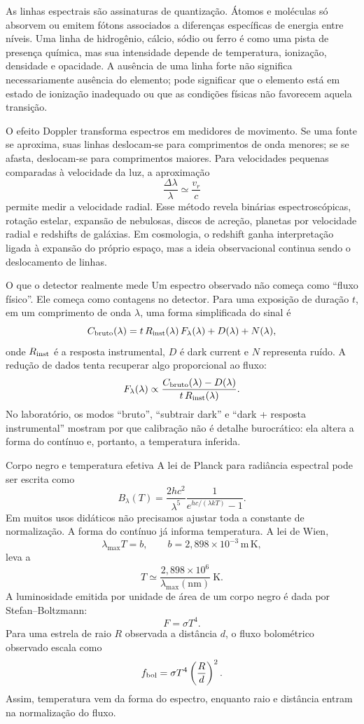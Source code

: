 \documentclass[11pt,a4paper]{article}
\begin{document}
As linhas espectrais são assinaturas de quantização. Átomos e moléculas só absorvem ou emitem fótons associados a diferenças específicas de energia entre níveis. Uma linha de hidrogênio, cálcio, sódio ou ferro é como uma pista de presença química, mas sua intensidade depende de temperatura, ionização, densidade e opacidade. A ausência de uma linha forte não significa necessariamente ausência do elemento; pode significar que o elemento está em estado de ionização inadequado ou que as condições físicas não favorecem aquela transição.

O efeito Doppler transforma espectros em medidores de movimento. Se uma fonte se aproxima, suas linhas deslocam-se para comprimentos de onda menores; se se afasta, deslocam-se para comprimentos maiores. Para velocidades pequenas comparadas à velocidade da luz, a aproximação
\[
\frac{\Delta\lambda}{\lambda}\simeq\frac{v_r}{c}
\]
permite medir a velocidade radial. Esse método revela binárias espectroscópicas, rotação estelar, expansão de nebulosas, discos de acreção, planetas por velocidade radial e redshifts de galáxias. Em cosmologia, o redshift ganha interpretação ligada à expansão do próprio espaço, mas a ideia observacional continua sendo o deslocamento de linhas.

\begin{lessonblock}{O que o detector realmente mede}
Um espectro observado não começa como ``fluxo físico''. Ele começa como contagens no detector. Para uma exposição de duração $t$, em um comprimento de onda $\lambda$, uma forma simplificada do sinal é
\[
C_{\rm bruto}(\lambda)=t\,R_{\rm inst}(\lambda)\,F_\lambda(\lambda)+D(\lambda)+N(\lambda),
\]
onde $R_{\rm inst}$ é a resposta instrumental, $D$ é dark current e $N$ representa ruído. A redução de dados tenta recuperar algo proporcional ao fluxo:
\[
F_\lambda(\lambda)\propto
\frac{C_{\rm bruto}(\lambda)-D(\lambda)}{t\,R_{\rm inst}(\lambda)}.
\]
No laboratório, os modos ``bruto'', ``subtrair dark'' e ``dark + resposta instrumental'' mostram por que calibração não é detalhe burocrático: ela altera a forma do contínuo e, portanto, a temperatura inferida.
\end{lessonblock}

\begin{lessonblock}[borderline west={2pt}{0pt}{astroGold}]{Corpo negro e temperatura efetiva}
A lei de Planck para radiância espectral pode ser escrita como
\[
B_\lambda(T)=\frac{2hc^2}{\lambda^5}
\frac{1}{e^{hc/(\lambda kT)}-1}.
\]
Em muitos usos didáticos não precisamos ajustar toda a constante de normalização. A forma do contínuo já informa temperatura. A lei de Wien,
\[
\lambda_{\max}T=b,\qquad b=2{,}898\times10^{-3}\,\mathrm{m\,K},
\]
leva a
\[
T\simeq\frac{2{,}898\times10^6}{\lambda_{\max}(\mathrm{nm})}\ \mathrm{K}.
\]
A luminosidade emitida por unidade de área de um corpo negro é dada por Stefan--Boltzmann:
\[
F=\sigma T^4.
\]
Para uma estrela de raio $R$ observada a distância $d$, o fluxo bolométrico observado escala como
\[
f_{\rm bol}=\sigma T^4\left(\frac{R}{d}\right)^2.
\]
Assim, temperatura vem da forma do espectro, enquanto raio e distância entram na normalização do fluxo.
\end{lessonblock}
\end{document}
